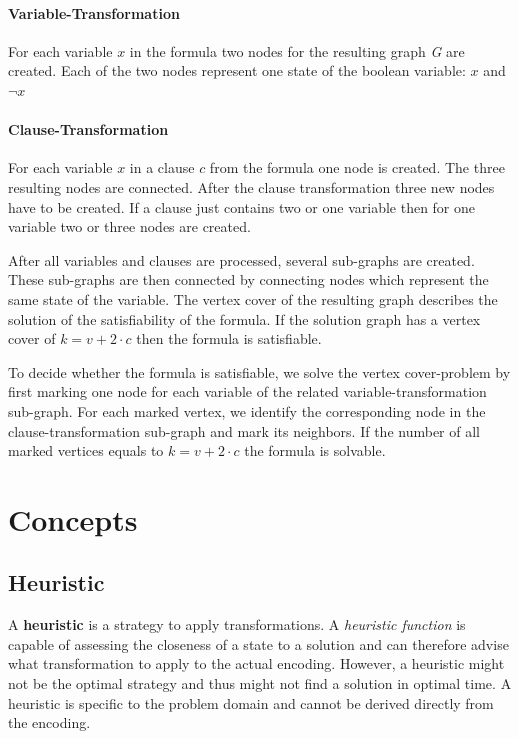 \documentclass[11pt]{article}
\begin{document}
\paragraph{Variable-Transformation}
For each variable $x$ in the formula two nodes for the resulting graph \emph{G} are created. Each of the two nodes represent one state of the boolean variable: $x$ and $\lnot x$

\paragraph{Clause-Transformation}
For each variable $x$ in a clause $c$ from the formula one node is created. The three resulting nodes are connected. After the clause transformation three new nodes have to be created. If a clause just contains two or one variable then for one variable two or three nodes are created.
\bigskip

After all variables and clauses are processed, several sub-graphs are created. These sub-graphs are then connected by connecting nodes which represent the same state of the variable. The vertex cover of the resulting graph describes the solution of the satisfiability of the formula. If the solution graph has a vertex cover of $k=v+2\cdot c$ then the formula is satisfiable. 

\bigskip

To decide whether the formula is satisfiable, we solve the vertex cover-problem by first marking one node for each variable of the related variable-transformation sub-graph. For each marked vertex, we identify the corresponding node in the clause-transformation sub-graph and mark its neighbors. If the number of all marked vertices equals to $k=v+2\cdot c$ the formula is solvable.

\section{Concepts}

\subsection{Heuristic}
A \textbf{heuristic} is a strategy to apply transformations. A \emph{heuristic function} is capable of assessing the closeness of a state to a solution and can therefore advise what transformation to apply to the actual encoding. However, a heuristic might not be the optimal strategy and thus might not find a solution in optimal time. A heuristic is specific to the problem domain and cannot be derived directly from the encoding.
\end{document}
